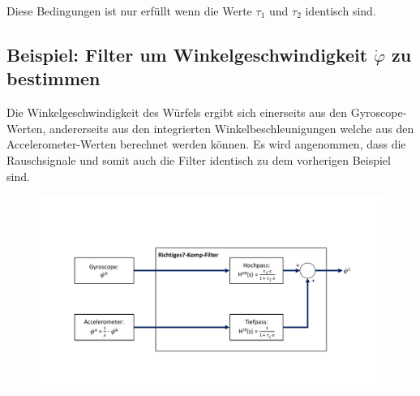 \documentclass{article}
\begin{document}
Diese Bedingungen ist nur erfüllt wenn die Werte $\tau_1$ und $\tau_2$ identisch sind.

\newpage
\subsection{Beispiel: Filter um Winkelgeschwindigkeit $\dot{\varphi}$ zu bestimmen}
Die Winkelgeschwindigkeit des Würfels ergibt sich einerseits aus den Gyroscope-Werten, andererseits aus den integrierten Winkelbeschleunigungen welche aus den Accelerometer-Werten berechnet werden können. Es wird angenommen, dass die Rauschsignale und somit auch die Filter identisch zu dem vorherigen Beispiel sind.

\begin{figure}[!h]
\includegraphics[scale=0.5,trim={0 3cm 0 4cm},clip]{Komp_CuBa_phi__d}
\end{figure}
\end{document}
